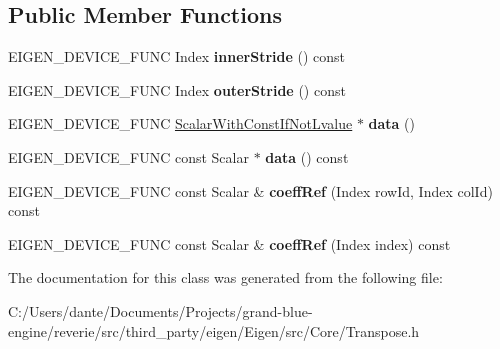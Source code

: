 \subsection*{Public Member Functions}
\begin{DoxyCompactItemize}
\item 
\mbox{\label{class_eigen_1_1_transpose_impl_3_01_matrix_type_00_01_dense_01_4_a7998b3bc5f9b696c4bdcc4f99ea5b561}} 
E\+I\+G\+E\+N\+\_\+\+D\+E\+V\+I\+C\+E\+\_\+\+F\+U\+NC Index {\bfseries inner\+Stride} () const
\item 
\mbox{\label{class_eigen_1_1_transpose_impl_3_01_matrix_type_00_01_dense_01_4_ad266062577d8fd6965996e028c8745a4}} 
E\+I\+G\+E\+N\+\_\+\+D\+E\+V\+I\+C\+E\+\_\+\+F\+U\+NC Index {\bfseries outer\+Stride} () const
\item 
\mbox{\label{class_eigen_1_1_transpose_impl_3_01_matrix_type_00_01_dense_01_4_a5c25d8591ef27b7732f4335a78f04d20}} 
E\+I\+G\+E\+N\+\_\+\+D\+E\+V\+I\+C\+E\+\_\+\+F\+U\+NC \mbox{\hyperlink{struct_eigen_1_1internal_1_1true__type}{Scalar\+With\+Const\+If\+Not\+Lvalue}} $\ast$ {\bfseries data} ()
\item 
\mbox{\label{class_eigen_1_1_transpose_impl_3_01_matrix_type_00_01_dense_01_4_ad877877e8b09c9edd1253fa9566c3ba6}} 
E\+I\+G\+E\+N\+\_\+\+D\+E\+V\+I\+C\+E\+\_\+\+F\+U\+NC const Scalar $\ast$ {\bfseries data} () const
\item 
\mbox{\label{class_eigen_1_1_transpose_impl_3_01_matrix_type_00_01_dense_01_4_a0f073fac5395961f1cc35385eed6ff86}} 
E\+I\+G\+E\+N\+\_\+\+D\+E\+V\+I\+C\+E\+\_\+\+F\+U\+NC const Scalar \& {\bfseries coeff\+Ref} (Index row\+Id, Index col\+Id) const
\item 
\mbox{\label{class_eigen_1_1_transpose_impl_3_01_matrix_type_00_01_dense_01_4_a6286a75aa13c407bf2395dd499d83fcb}} 
E\+I\+G\+E\+N\+\_\+\+D\+E\+V\+I\+C\+E\+\_\+\+F\+U\+NC const Scalar \& {\bfseries coeff\+Ref} (Index index) const
\end{DoxyCompactItemize}


The documentation for this class was generated from the following file\+:\begin{DoxyCompactItemize}
\item 
C\+:/\+Users/dante/\+Documents/\+Projects/grand-\/blue-\/engine/reverie/src/third\+\_\+party/eigen/\+Eigen/src/\+Core/Transpose.\+h\end{DoxyCompactItemize}
